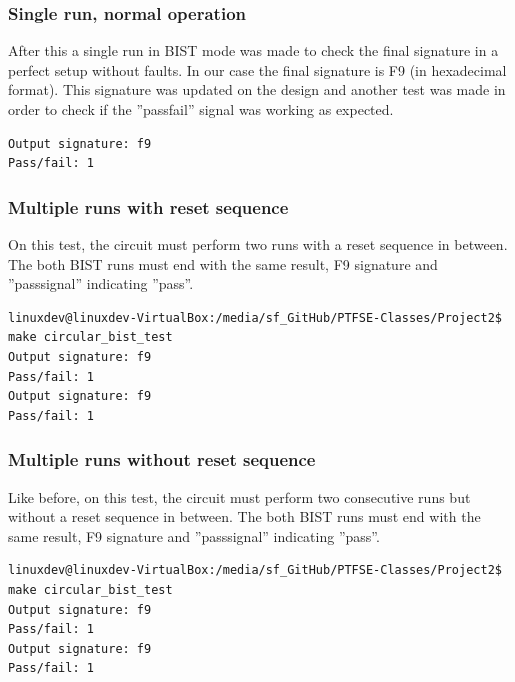 \documentclass[12pt]{article}
\begin{document}
    \subsubsection*{Single run, normal operation}
    
After this a single run in BIST mode was made to check the final signature in a perfect setup without faults. In our case the final signature is F9 (in hexadecimal format). This signature was updated on the design and another test was made in order to check if the ''pass\textunderscore fail'' signal was working as expected.

    \begin{lstlisting}[caption={BIST normal operation output.},captionpos=b]
Output signature: f9
Pass/fail: 1
    \end{lstlisting}  
 






    
    \subsubsection*{Multiple runs with reset sequence}
    
    On this test, the circuit must perform two runs with a reset sequence in between. The both BIST runs must end with the same result, F9 signature and ''pass\textunderscore signal'' indicating ''pass''.
    
    \begin{lstlisting}[caption={Multiple runs with reset sequence output.},captionpos=b]
linuxdev@linuxdev-VirtualBox:/media/sf_GitHub/PTFSE-Classes/Project2$ make circular_bist_test
Output signature: f9
Pass/fail: 1
Output signature: f9
Pass/fail: 1
    \end{lstlisting} 
    
    \subsubsection*{Multiple runs without reset sequence}
    
    Like before, on this test, the circuit must perform two consecutive runs but without a reset sequence in between. The both BIST runs must end with the same result, F9 signature and ''pass\textunderscore signal'' indicating ''pass''.
    
    \begin{lstlisting}[caption={Multiple runs without reset sequence output.},captionpos=b]
linuxdev@linuxdev-VirtualBox:/media/sf_GitHub/PTFSE-Classes/Project2$ make circular_bist_test
Output signature: f9
Pass/fail: 1
Output signature: f9
Pass/fail: 1
    \end{lstlisting}
    
\end{document}
